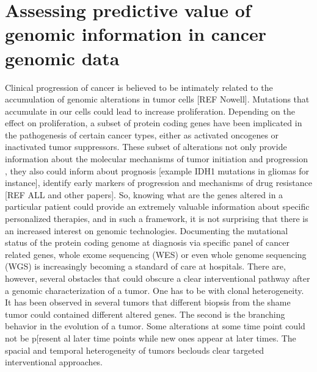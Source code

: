 \documentclass[a4paper,11pt]{article}
\begin{document}

\section{Assessing predictive value of genomic information in cancer genomic data}\label{sec:cancer}

Clinical progression of cancer is believed to be intimately related to the accumulation of genomic alterations in tumor cells [REF Nowell]. Mutations that accumulate in our cells could lead to increase proliferation. Depending on the effect on proliferation,  
a subset of protein coding genes have been implicated in the pathogenesis of certain cancer types, either as activated oncogenes or inactivated tumor suppressors. These subset of alterations not only provide information about the molecular mechanisms of tumor initiation and progression  \cite{wang2015tumor}, they also could inform about prognosis [example IDH1 mutations in gliomas for instance], identify early markers of progression \cite{rossi2014clinical} and mechanisms of drug resistance [REF ALL and other papers]. So, knowing what are the genes altered in a particular patient could provide an extremely valuable information about specific personalized therapies, and in such a framework, it is not surprising that there is an increased interest on genomic technologies. Documenting the mutational status of the protein coding genome at diagnosis via specific panel of cancer related genes, whole exome sequencing (WES) or even whole genome sequencing (WGS) is increasingly becoming a standard of care at hospitals.  There are, however, several obstacles that could obscure a clear interventional pathway after a genomic characterization of a tumor. One has to be with clonal heterogeneity. It has been observed in several tumors that different biopsis from the shame tumor could contained different altered genes. The second is the branching behavior in the evolution of a tumor. Some alterations at some time point could not be p[resent al later time points while new ones appear at later times. The spacial and temporal heterogeneity of tumors beclouds clear targeted interventional approaches.   
\end{document}
